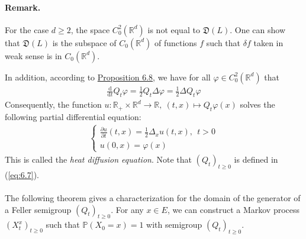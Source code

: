 \documentclass{article}
\numberwithin{equation}{section}
\renewcommand{\P}{\mathbb{P}}
\renewcommand{\d}{\mathrm{d}}
\theoremstyle{plain}
\theoremstyle{definition}
\begin{document}
\paragraph{Remark.} For the case $d\geq 2$, the space $C_0^2(\mathbb{R}^d)$ is not equal to $\mathfrak{D}(L)$. One can show that $\mathfrak{D}(L)$ is the subspace of $C_0(\mathbb{R}^d)$ of functions $f$ such that $\delta f$ taken in weak sense is in $C_0(\mathbb{R}^d)$. 

In addition, according to \hyperref[prop:6.8]{Proposition 6.8}, we have for all $\varphi\in C_0^2(\mathbb{R}^d)$ that
\begin{align*}
	\frac{\d}{\d t}Q_t\varphi = \frac{1}{2}Q_t\Delta \varphi=\frac{1}{2}\Delta Q_t\varphi
\end{align*}
Consequently, the function $u:\mathbb{R}_+\times\mathbb{R}^d\to\mathbb{R},\ (t,x)\mapsto Q_t\varphi(x)$ solves the following partial differential equation:
\begin{align*}
	\begin{cases}
		\frac{\partial u}{\partial t}(t,x) = \frac{1}{2}\Delta_x u(t,x),\ \ t>0\\
		u(0,x)=\varphi(x)
	\end{cases}
\end{align*}
This is called the \textit{heat diffusion equation}. Note that $(Q_t)_{t\geq 0}$ is defined in (\ref{eq:6.7}).

\paragraph{} The following theorem gives a characterization for the domain of the generator of a Feller semigroup $(Q_t)_{t\geq 0}$. For any $x\in E$, we can construct a Markov process $(X_t^x)_{t\geq 0}$ such that $\P(X_0=x)=1$ with semigroup $(Q_t)_{t\geq 0}$.
\end{document}
